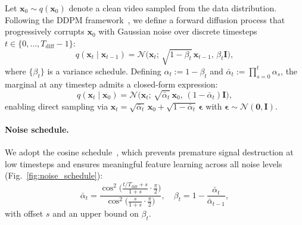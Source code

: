\documentclass{ieeeaccess}
\begin{document}
Let $\mathbf{x}_0 \sim q(\mathbf{x}_0)$ denote a clean video sampled from the data distribution. Following the DDPM framework~\cite{ho2020ddpm}, we define a forward diffusion process that progressively corrupts $\mathbf{x}_0$ with Gaussian noise over discrete timesteps $t \in \{0, \ldots, T_\mathrm{diff}-1\}$:
\begin{equation}
    q(\mathbf{x}_t \mid \mathbf{x}_{t-1}) = \mathcal{N}\bigl(\mathbf{x}_t;\, \sqrt{1-\beta_t}\,\mathbf{x}_{t-1},\, \beta_t \mathbf{I}\bigr),
\end{equation}
where $\{\beta_t\}$ is a variance schedule. Defining $\alpha_t := 1 - \beta_t$ and $\bar{\alpha}_t := \prod_{s=0}^{t} \alpha_s$, the marginal at any timestep admits a closed-form expression:
\begin{equation}
    q(\mathbf{x}_t \mid \mathbf{x}_0) = \mathcal{N}\bigl(\mathbf{x}_t;\, \sqrt{\bar{\alpha}_t}\,\mathbf{x}_0,\, (1-\bar{\alpha}_t)\mathbf{I}\bigr),
\end{equation}
enabling direct sampling via $\mathbf{x}_t = \sqrt{\bar{\alpha}_t}\,\mathbf{x}_0 + \sqrt{1-\bar{\alpha}_t}\,\boldsymbol{\epsilon}$ with $\boldsymbol{\epsilon} \sim \mathcal{N}(\mathbf{0}, \mathbf{I})$.

\paragraph{Noise schedule.} We adopt the cosine schedule~\cite{nichol2021improved}, which prevents premature signal destruction at low timesteps and ensures meaningful feature learning across all noise levels (Fig.~\ref{fig:noise_schedule}):
\begin{equation}
    \bar{\alpha}_t = \frac{\cos^2\!\bigl(\tfrac{t/T_\mathrm{diff}+s}{1+s} \cdot \tfrac{\pi}{2}\bigr)}{\cos^2\!\bigl(\tfrac{s}{1+s} \cdot \tfrac{\pi}{2}\bigr)},\quad \beta_t = 1 - \frac{\bar{\alpha}_t}{\bar{\alpha}_{t-1}},
\end{equation}
with offset $s$ and an upper bound on $\beta_t$.
\end{document}
